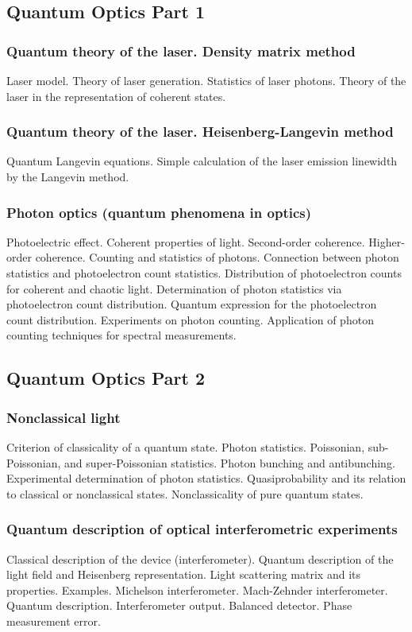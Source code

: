 \subsection{Quantum Optics Part 1}
\subsubsection{Quantum theory of the laser. Density matrix method}
Laser model. Theory of laser generation. Statistics of laser
photons. Theory of the laser in the representation of coherent states.
\subsubsection{Quantum theory of the laser. Heisenberg-Langevin method}
Quantum Langevin equations. Simple calculation of the laser emission linewidth by the Langevin method.
\subsubsection{Photon optics (quantum phenomena in optics)}
Photoelectric effect.
Coherent properties of light.
Second-order coherence.
Higher-order coherence.
Counting and statistics of photons.
Connection between photon statistics and photoelectron count statistics.
Distribution of photoelectron counts for coherent and chaotic
light.
Determination of photon statistics via photoelectron count
distribution.
Quantum expression for the photoelectron count distribution.
Experiments on photon counting. Application of photon counting
techniques for spectral measurements.

\subsection{Quantum Optics Part 2}
\subsubsection{Nonclassical light}
Criterion of classicality of a quantum state. Photon statistics.
Poissonian, sub-Poissonian, and super-Poissonian
statistics. Photon bunching and antibunching. Experimental
determination of photon statistics. Quasiprobability and its relation to
classical or nonclassical states. Nonclassicality of pure quantum states.
\subsubsection{Quantum description of optical interferometric
  experiments}
Classical description of the device (interferometer).
Quantum description of the light field and Heisenberg representation.
Light scattering matrix and its properties.
Examples. Michelson interferometer. Mach-Zehnder interferometer.
Quantum description. Interferometer output. Balanced detector. Phase measurement error.

